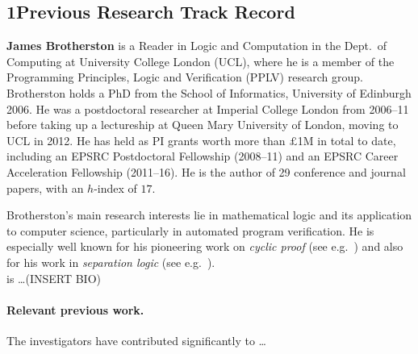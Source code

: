 \documentclass[11pt,twocolumn]{article}
\begin{document}


\begin{abstract}
  
\end{abstract}

\subsection*{1\quad Previous Research Track Record}

{\bf James Brotherston} is a Reader in Logic and Computation in the Dept.\ of Computing at University College London (UCL), where he is a member of the Programming Principles, Logic and Verification (PPLV) research group.  Brotherston holds a PhD from the School of Informatics, University of Edinburgh 2006.  He was a postdoctoral researcher at Imperial College London from 2006--11 before taking up a lectureship at Queen Mary University of London, moving to UCL in 2012. He has held as PI grants worth more than $\pounds$1M in total to date, including an EPSRC Postdoctoral Fellowship (2008--11) and an EPSRC Career Acceleration Fellowship (2011--16). He is the author of 29 conference and journal papers, with an $h$-index of $17$.

Brotherston's main research interests lie in mathematical logic and its application to computer science, particularly in automated program verification. He is especially well known for his pioneering work on \emph{cyclic proof} (see e.g.~) and also for his work in \emph{separation logic} (see e.g.~).  \\

 is \ldots (INSERT BIO)

\paragraph{Relevant previous work.}
The investigators have contributed significantly to \ldots
\end{document}
